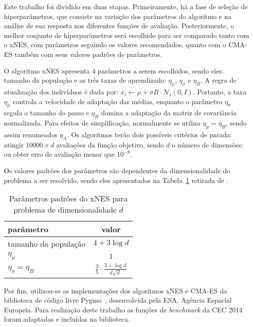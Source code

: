 Este trabalho foi dividido em duas etapas.
Primeiramente, há a fase de seleção de hiperparâmetros, que consiste na variação dos parâmetros do algoritmo e na análise de
sua resposta nas diferentes funções de avaliação.
Posteriormente, o melhor conjunto de hiperparâmetros será escolhido para ser comparado tanto com o xNES, com parâmetros
seguindo os valores recomendados, quanto com o CMA-ES também com seus valores padrões de parâmetros.

O algoritmo xNES apresenta 4 parâmetros a serem escolhidos, sendo eles: tamanho da população e as três taxas de aprendizado:
$\eta_{\mu}$, $\eta_{\sigma}$ e $\eta_{B}$.
A regra de atualização dos indivíduos é dada por: $x_i \leftarrow \mu + \sigma B \cdot \mathcal{N}_i(0, I)$.
Portanto, a taxa $\eta_{\mu}$ controla a velocidade de adaptação das médias, enquanto o parâmetro $\eta_{\sigma}$ regula o tamanho
do passo e $\eta_{B}$ domina a adaptação da matriz de covariância normalizada.
Para efeitos de simplificação, normalmente se utiliza $\eta_{\mu} = \eta_B$, sendo assim renomeados $\eta_A$.
Os algoritmos terão dois possíveis critérios de parada: atingir $10000 \times d$ avaliações da função objetivo, sendo $d$
o número de dimensões; ou obter erro de avaliação menor que $10^{-8}$.

Os valores padrões dos parâmetros são dependentes da dimensionalidade do problema a ser resolvido, sendo eles apresentados
na Tabela~\ref{tab:xnes_default} retirada de \cite{glasmachers10}.

\begin{table}[!t]
\renewcommand{\arraystretch}{1.3}
\caption{Parâmetros padrões do xNES para problema de dimensionalidade $d$}
\label{tab:xnes_default}
\centering
\begin{tabular}{|l|c|}
\hline
\bfseries parâmetro & \bfseries valor\\
\hline
tamanho da população & $4 + 3 \log d$\\
$\eta_{\mu}$ & $1$\\
$\eta_{\sigma} = \eta_B$ & $\frac{3}{5} \cdot \frac{3 + \log d}{d \sqrt{d}}$\\
\hline
\end{tabular}
\end{table}

Por fim, utilizou-se as implementações dos algoritmos xNES e CMA-ES da biblioteca de código livre Pygmo~\cite{pygmo},
desenvolvida pela ESA, Agência Espacial Europeia.
Para realização deste trabalho as funções de \textit{benchmark} da CEC 2014 foram adaptadas e incluídas na biblioteca.

